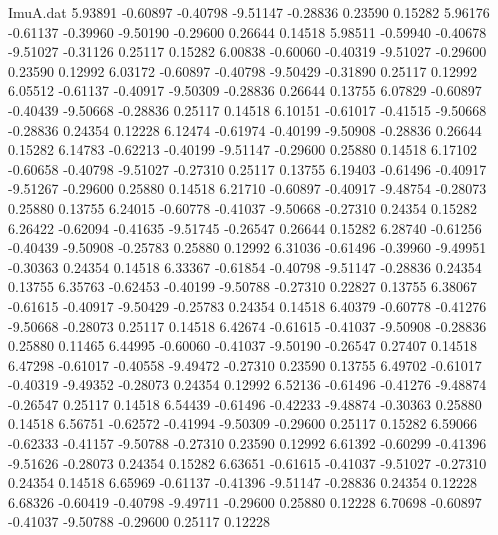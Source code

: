 \begin{filecontents}{ImuA.dat}
   5.93891   -0.60897   -0.40798   -9.51147   -0.28836    0.23590    0.15282
   5.96176   -0.61137   -0.39960   -9.50190   -0.29600    0.26644    0.14518
   5.98511   -0.59940   -0.40678   -9.51027   -0.31126    0.25117    0.15282
   6.00838   -0.60060   -0.40319   -9.51027   -0.29600    0.23590    0.12992
   6.03172   -0.60897   -0.40798   -9.50429   -0.31890    0.25117    0.12992
   6.05512   -0.61137   -0.40917   -9.50309   -0.28836    0.26644    0.13755
   6.07829   -0.60897   -0.40439   -9.50668   -0.28836    0.25117    0.14518
   6.10151   -0.61017   -0.41515   -9.50668   -0.28836    0.24354    0.12228
   6.12474   -0.61974   -0.40199   -9.50908   -0.28836    0.26644    0.15282
   6.14783   -0.62213   -0.40199   -9.51147   -0.29600    0.25880    0.14518
   6.17102   -0.60658   -0.40798   -9.51027   -0.27310    0.25117    0.13755
   6.19403   -0.61496   -0.40917   -9.51267   -0.29600    0.25880    0.14518
   6.21710   -0.60897   -0.40917   -9.48754   -0.28073    0.25880    0.13755
   6.24015   -0.60778   -0.41037   -9.50668   -0.27310    0.24354    0.15282
   6.26422   -0.62094   -0.41635   -9.51745   -0.26547    0.26644    0.15282
   6.28740   -0.61256   -0.40439   -9.50908   -0.25783    0.25880    0.12992
   6.31036   -0.61496   -0.39960   -9.49951   -0.30363    0.24354    0.14518
   6.33367   -0.61854   -0.40798   -9.51147   -0.28836    0.24354    0.13755
   6.35763   -0.62453   -0.40199   -9.50788   -0.27310    0.22827    0.13755
   6.38067   -0.61615   -0.40917   -9.50429   -0.25783    0.24354    0.14518
   6.40379   -0.60778   -0.41276   -9.50668   -0.28073    0.25117    0.14518
   6.42674   -0.61615   -0.41037   -9.50908   -0.28836    0.25880    0.11465
   6.44995   -0.60060   -0.41037   -9.50190   -0.26547    0.27407    0.14518
   6.47298   -0.61017   -0.40558   -9.49472   -0.27310    0.23590    0.13755
   6.49702   -0.61017   -0.40319   -9.49352   -0.28073    0.24354    0.12992
   6.52136   -0.61496   -0.41276   -9.48874   -0.26547    0.25117    0.14518
   6.54439   -0.61496   -0.42233   -9.48874   -0.30363    0.25880    0.14518
   6.56751   -0.62572   -0.41994   -9.50309   -0.29600    0.25117    0.15282
   6.59066   -0.62333   -0.41157   -9.50788   -0.27310    0.23590    0.12992
   6.61392   -0.60299   -0.41396   -9.51626   -0.28073    0.24354    0.15282
   6.63651   -0.61615   -0.41037   -9.51027   -0.27310    0.24354    0.14518
   6.65969   -0.61137   -0.41396   -9.51147   -0.28836    0.24354    0.12228
   6.68326   -0.60419   -0.40798   -9.49711   -0.29600    0.25880    0.12228
   6.70698   -0.60897   -0.41037   -9.50788   -0.29600    0.25117    0.12228

\end{filecontents}
